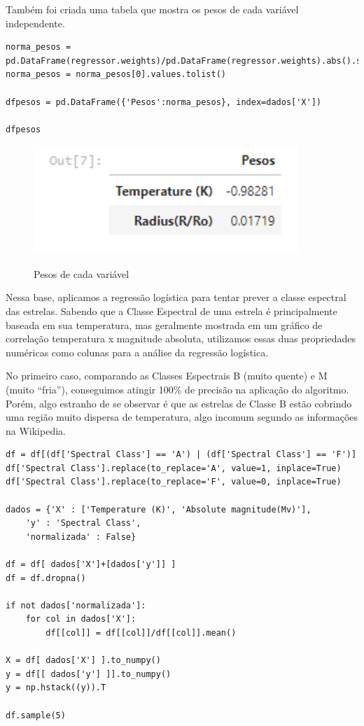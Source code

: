 \documentclass[12pt]{article}
\begin{document}
\vspace{120pt}
Também foi criada uma tabela que mostra os pesos de cada variável independente.\\

\begin{lstlisting}
norma_pesos = pd.DataFrame(regressor.weights)/pd.DataFrame(regressor.weights).abs().sum()
norma_pesos = norma_pesos[0].values.tolist()

dfpesos = pd.DataFrame({'Pesos':norma_pesos}, index=dados['X'])

dfpesos
\end{lstlisting}

\begin{figure}[h]
\caption{Pesos de cada variável}
\centering
\includegraphics[width=10cm]{out2.png}
\label{figura:out2}
\end{figure}

Nessa base, aplicamos a regressão logística para tentar prever a classe espectral das estrelas. Sabendo que a Classe Espectral de uma estrela é principalmente baseada em sua temperatura, mas geralmente mostrada em um gráfico de correlação temperatura x magnitude absoluta, utilizamos essas duas propriedades numéricas como colunas para a análise da regressão logística.

\hspace{0.4cm} No primeiro caso, comparando as Classes Espectrais B (muito quente) e M (muito “fria”), conseguimos atingir 100\% de precisão na aplicação do algoritmo. Porém, algo estranho de se observar é que as estrelas de Classe B estão cobrindo uma região muito dispersa de temperatura, algo incomum segundo as informações na Wikipedia.\\

\begin{lstlisting}
df = df[(df['Spectral Class'] == 'A') | (df['Spectral Class'] == 'F')]
df['Spectral Class'].replace(to_replace='A', value=1, inplace=True)
df['Spectral Class'].replace(to_replace='F', value=0, inplace=True)

dados = {'X' : ['Temperature (K)', 'Absolute magnitude(Mv)'],
    'y' : 'Spectral Class',
    'normalizada' : False}

df = df[ dados['X']+[dados['y']] ]
df = df.dropna()

if not dados['normalizada']:
    for col in dados['X']:
        df[[col]] = df[[col]]/df[[col]].mean()

X = df[ dados['X'] ].to_numpy()
y = df[[ dados['y'] ]].to_numpy()
y = np.hstack((y)).T

df.sample(5)
\end{lstlisting}
\end{document}
